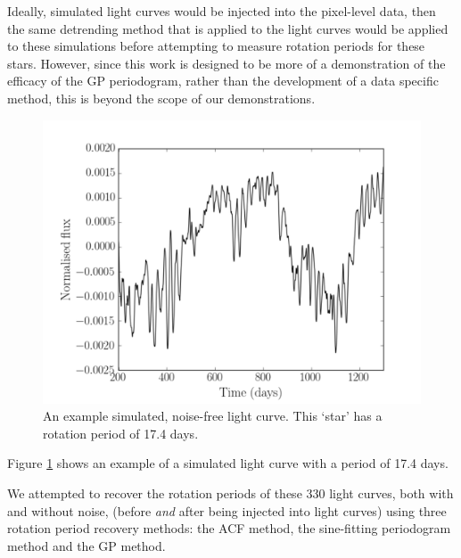 Ideally, simulated light curves would be injected into the pixel-level data,
then the same detrending method that is applied to the \kepler light curves
would be applied to these simulations before attempting to measure rotation
periods for these stars.
However, since this work is designed to be more of a demonstration of the
efficacy of the GP periodogram, rather than the development of a \Kepler data
specific method, this is beyond the scope of our demonstrations.
\begin{figure}
\begin{center}
\includegraphics[width=6in, clip=true]{figures/thesis_plot.pdf}
\caption{An example simulated, noise-free light curve. This `star' has a
rotation period of 17.4 days.}
\label{fig:noise-free_lc}
\end{center}
\end{figure}
Figure \ref{fig:noise-free_lc} shows an example of a simulated light curve
with a period of 17.4 days.

We attempted to recover the rotation periods of these 330 light curves, both
with and without noise, (\ie before {\it and} after being injected into
\kepler light curves) using three rotation period recovery methods: the ACF
method, the sine-fitting periodogram method and the GP method.

